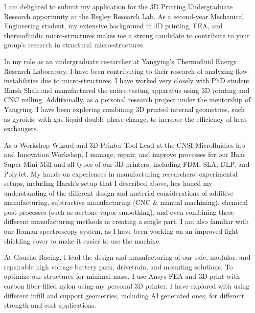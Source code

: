 \documentclass[11pt, letterpaper]{awesome-cv} %
\begin{document}
\makecvheader %

\makelettertitle %


\begin{cvletter}


I am delighted to submit my application for the 3D Printing Undergraduate Research opportunity at the Begley Research Lab. As a second-year Mechanical Engineering student, my extensive background in 3D printing, FEA, and thermofluidic micro-structures makes me a strong candidate to contribute to your group's research in structural micro-structures.

In my role as an undergraduate researcher at Yangying's Thermofluid Energy Research Laboratory, I have been contributing to their research of analyzing flow instabilities due to micro-structures. I have worked very closely with PhD student Harsh Shah and manufactured the entire testing apparatus using 3D printing and CNC milling. Additionally, as a personal research project under the mentorship of Yangying, I have been exploring combining 3D printed internal geometries, such as gyroids, with gas-liquid double phase change, to increase the efficiency of heat exchangers. 

As a Workshop Wizard and 3D Printer Tool Lead at the CNSI Microfluidics lab and Innovation Workshop, I manage, repair, and improve processes for our Haas Super Mini Mill and all types of our 3D printers, including FDM, SLA, DLP, and PolyJet. My hands-on experiences in manufacturing researchers' experimental setups, including Harsh's setup that I described above, has honed my understanding of the different design and material considerations of additive manufacturing, subtractive manufacturing (CNC \& manual machining), chemical post-processes (such as acetone vapor smoothing), and even combining these different manufacturing methods in creating a single part. I am also familiar with our Raman spectroscopy system, as I have been working on an improved light shielding cover to make it easier to use the machine.

At Gaucho Racing, I lead the design and manufacturing of our safe, modular, and repairable high voltage battery pack, drivetrain, and mounting solutions. To optimize our structures for minimal mass, I use Ansys FEA and 3D print with carbon fiber-filled nylon using my personal 3D printer. I have explored with using different infill and support geometries, including AI generated ones, for different strength and cost applications.


\end{cvletter}
\end{document}

